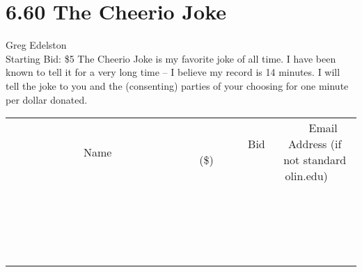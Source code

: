 \documentclass[11pt]{article}
\begin{document}
\section*{6.60 The Cheerio Joke}
Greg Edelston
\\
Starting Bid: \$5
\newline
The Cheerio Joke is my favorite joke of all time. I have been known to tell it for a very long time -- I believe my record is 14 minutes. I will tell the joke to you and the (consenting) parties of your choosing for one minute per dollar donated.
\\[3ex]
\begin{tabular}{c c c}
~~~~~~~~~~~~~Name~~~~~~~~~~~~~ & ~~~~~~~~~Bid (\$)~~~~~~~~~  & ~~~Email Address (if not standard olin.edu)~~~\\
 & & \\
\hline
 & & \\
\hline
 & & \\
\hline
 & & \\
\hline
 & & \\
\hline
 & & \\
\hline
 & & \\
\hline
 & & \\
\hline
 & & \\
\hline
 & & \\
\hline
 & & \\
\hline
 & & \\
\hline
 & & \\
\hline
 & & \\
\hline
 & & \\
\hline
 & & \\
\hline
 & & \\
\hline
 & & \\
\hline
 & & \\
\hline
\end{tabular}
\newpage
\end{document}

